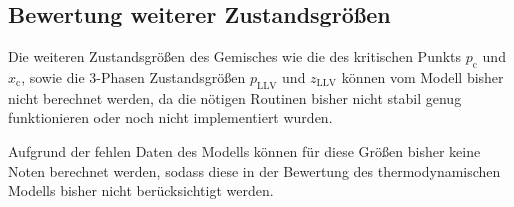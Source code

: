 \documentclass[../thesis.tex]{subfiles}
\begin{document}
\subsection{Bewertung weiterer Zustandsgrößen}

Die weiteren Zustandsgrößen des Gemisches wie die des kritischen Punkts $ p_{\mathrm{c}}$ und $ x_{\mathrm{c}}$, sowie die 3-Phasen Zustandsgrößen $p_{\mathrm{LLV}}$ und $z_{\mathrm{LLV}}$ können vom Modell bisher nicht berechnet werden, da die nötigen Routinen bisher nicht stabil genug funktionieren oder noch nicht implementiert wurden.

Aufgrund der fehlen Daten des Modells können für diese Größen bisher keine Noten berechnet werden, sodass diese in der Bewertung des thermodynamischen Modells bisher nicht berücksichtigt werden.
\end{document}
